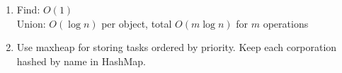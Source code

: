 \documentclass[12pt, a4paper]{article}
\begin{document}
\begin{enumerate}[Q\arabic*.]
\begin{enumerate}[(\alph*.)]
      \item Find: $O(1)$\\
        Union: $O(\log n)$ per object, total $O(m\log n)$ for $m$ operations

      \item Use maxheap for storing tasks ordered by priority. Keep each corporation hashed by name in HashMap.
    \end{enumerate}
\end{enumerate}
\end{document}
